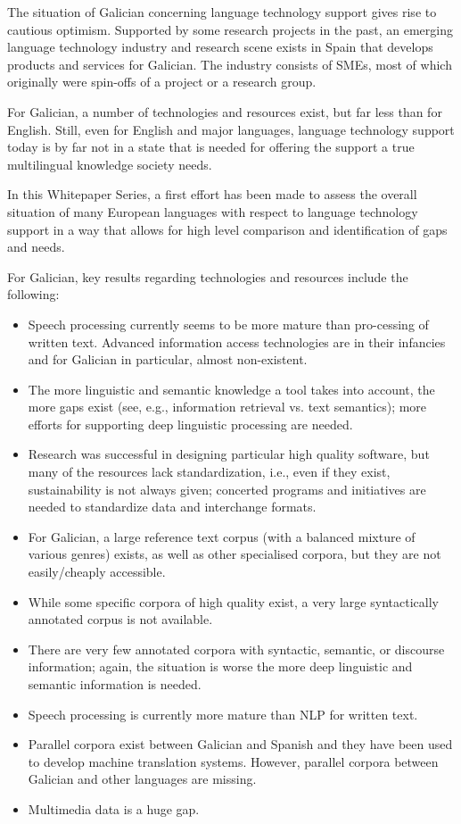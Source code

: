 \begin{multicols}{2}
\begin{itemize}
\begin{multicols}{2}
   The situation of Galician concerning language technology support gives rise to cautious optimism. Supported by some research projects in the past, an emerging language technology industry and research scene exists in Spain that develops products and services for Galician. The industry consists of SMEs, most of which originally were spin-offs of a project or a research group.

For Galician, a number of technologies and resources exist, but far less than for English. Still, even for English and major languages, language technology support today is by far not in a state that is needed for offering the support a true multilingual knowledge society needs.

In this Whitepaper Series, a first effort has been made to assess the overall situation of many European languages with respect to language technology support in a way that allows for high level comparison and identification of gaps and needs.

For Galician, key results regarding technologies and resources include the following:
	\begin{itemize}
		\item Speech processing currently seems to be more mature than pro-cessing of written text. Advanced information access technologies are in their infancies and for Galician in particular, almost non-existent.
		\item The more linguistic and semantic knowledge a tool takes into account, the more gaps exist (see, e.g., information retrieval vs. text semantics); more efforts for supporting deep linguistic processing are needed.
		\item Research was successful in designing particular high quality software, but many of the resources lack standardization, i.e., even if they exist, sustainability is not always given; concerted programs and initiatives are needed to standardize data and interchange formats.
		\item For Galician, a large reference text corpus (with a balanced mixture of various genres) exists, as well as other specialised corpora, but they are not easily/cheaply accessible.
		\item While some specific corpora of high quality exist, a very large syntactically annotated corpus is not available.
		\item There are very few annotated corpora with syntactic, semantic, or discourse information; again, the situation is worse the more deep linguistic and semantic information is needed.
		\item Speech processing is currently more mature than NLP for written text.
		\item Parallel corpora exist between Galician and Spanish and they have been used to develop machine translation systems. However, parallel corpora between Galician and other languages are missing.
		\item Multimedia data is a huge gap.
 	\end{itemize}


\end{multicols}
\end{itemize}
\end{multicols}
